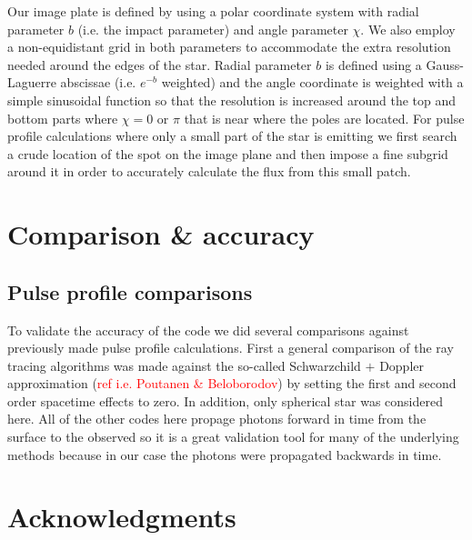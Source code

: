 \documentclass[iop, usenatbib]{emulateapj}
\newcommand{\red}[1]{\textcolor{red}{#1}}
\begin{document}
Our image plate is defined by using a polar coordinate system with radial parameter $b$ (i.e. the impact parameter) and angle parameter $\chi$.
We also employ a non-equidistant grid in both parameters to accommodate the extra resolution needed around the edges of the star.
Radial parameter $b$ is defined using a Gauss-Laguerre abscissae (i.e. $e^{-b}$ weighted) and the angle coordinate is weighted with a simple sinusoidal function so that the resolution is increased around the top and bottom parts where $\chi = 0$ or $\pi$ that is near where the poles are located.
For pulse profile calculations where only a small part of the star is emitting we first search a crude location of the spot on the image plane and then impose a fine subgrid around it in order to accurately calculate the flux from this small patch.


\section{Comparison \& accuracy}

\subsection{Pulse profile comparisons}

To validate the accuracy of the code we did several comparisons against previously made pulse profile calculations.
First a general comparison of the ray tracing algorithms was made against the so-called Schwarzchild $+$ Doppler approximation (\red{ref i.e. Poutanen \& Beloborodov}) by setting the first and second order spacetime effects to zero.
In addition, only spherical star was considered here.
All of the other codes here propage photons forward in time from the surface to the observed so it is a great validation tool for many of the underlying methods because in our case the photons were propagated backwards in time.





\section*{Acknowledgments}



\end{document}

